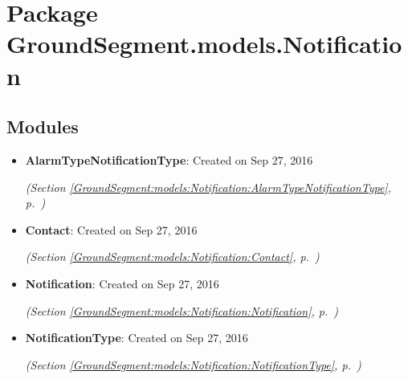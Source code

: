 %
%
%


\section{Package GroundSegment.models.Notification}

    \label{GroundSegment:models:Notification}


\subsection{Modules}

\begin{itemize}
\setlength{\parskip}{0ex}
\item \textbf{AlarmTypeNotificationType}: 
Created on Sep 27, 2016




  \textit{(Section \ref{GroundSegment:models:Notification:AlarmTypeNotificationType}, p.~\pageref{GroundSegment:models:Notification:AlarmTypeNotificationType})}

\item \textbf{Contact}: 
Created on Sep 27, 2016




  \textit{(Section \ref{GroundSegment:models:Notification:Contact}, p.~\pageref{GroundSegment:models:Notification:Contact})}

\item \textbf{Notification}: 
Created on Sep 27, 2016




  \textit{(Section \ref{GroundSegment:models:Notification:Notification}, p.~\pageref{GroundSegment:models:Notification:Notification})}

\item \textbf{NotificationType}: 
Created on Sep 27, 2016




  \textit{(Section \ref{GroundSegment:models:Notification:NotificationType}, p.~\pageref{GroundSegment:models:Notification:NotificationType})}

\end{itemize}

